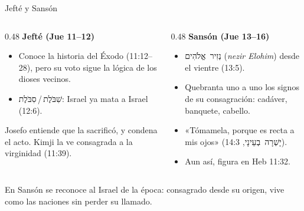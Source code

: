 \documentclass[hyperref={bookmarks=false},aspectratio=169]{beamer}
\newcommand{\heb}[1]{\mbox{\foreignlanguage{hebrew}{#1}}}
\begin{document}
\begin{frame}{Jefté y Sansón}
\begin{columns}[T,onlytextwidth]
\begin{column}{0.48\textwidth}\footnotesize
\textbf{\textcolor{cafe}{Jefté (Jue 11--12)}}
\begin{itemize}
\item Conoce la historia del Éxodo (11:12--28), pero su voto sigue la lógica de los dioses vecinos.
\item \heb{שִׁבֹּלֶת}\,/\,\heb{סִבֹּלֶת}: Israel ya mata a Israel (12:6).
\end{itemize}
\begin{notalam}
Josefo entiende que la sacrificó, y condena el acto. Kimji la ve consagrada a la virginidad (11:39).
\end{notalam}
\end{column}
\begin{column}{0.48\textwidth}\footnotesize
\textbf{\textcolor{cafe}{Sansón (Jue 13--16)}}
\begin{itemize}
\item \heb{נְזִיר אֱלֹהִים} (\emph{nezir Elohim}) desde el vientre (13:5).
\item Quebranta uno a uno los signos de su consagración: cadáver, banquete, cabello.
\item «Tómamela, porque es recta a mis ojos» (\heb{יָשְׁרָה בְעֵינָי}, 14:3).
\item Aun así, figura en Heb 11:32.
\end{itemize}
\end{column}
\end{columns}
\vspace{6pt}
\begin{clave}
En Sansón se reconoce al Israel de la época: consagrado desde su origen, vive como las naciones sin perder su llamado.
\end{clave}
\end{frame}
\end{document}
